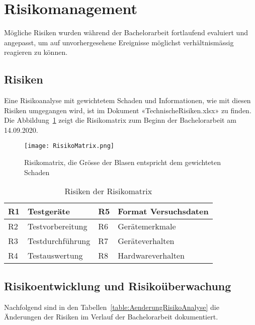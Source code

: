 \section{Risikomanagement
\label{Risikomanagement}}
Mögliche Risiken wurden während der Bachelorarbeit fortlaufend evaluiert 
und angepasst, um auf unvorhergesehene Ereignisse möglichst verhältnismässig 
reagieren zu können.

\subsection*{Risiken}
Eine Risikoanalyse mit gewichtetem Schaden und Informationen, 
wie mit diesen Risiken umgegangen wird, 
ist im Dokument «TechnischeRisiken.xlsx» zu finden. 
Die Abbildung~\ref{figure:Risikomatrix} zeigt die Risikomatrix zum Beginn
der Bachelorarbeit am 14.09.2020.

\begin{figure}[h!]
	\centering
	\texttt{[image: RisikoMatrix.png]}
	\caption{Risikomatrix, die Grösse der Blasen entspricht dem gewichteten Schaden
	\label{figure:Risikomatrix}}
\end{figure}

\begin{table}[H]
	\centering
	\begin{tabularx}{\linewidth}{| l | X | l | X |}
		\hline
		R1 & Testgeräte & R5 & Format Versuchsdaten \\
		\hline
		R2 & Testvorbereitung & R6 & Gerätemerkmale \\
		\hline
		R3 & Testdurchführung & R7 & Geräteverhalten \\
		\hline
		R4 & Testauswertung & R8 & Hardwareverhalten \\		
		\hline 
	\end{tabularx} 
	\caption{Risiken der Risikomatrix
	\label{table:RisikenMatrix}} 
\end{table}

\clearpage 

\subsection*{Risikoentwicklung und Risikoüberwachung}
Nachfolgend sind in den Tabellen~\ref{table:AenderungRisikoAnalyse}
die Änderungen der Risiken im Verlauf der Bachelorarbeit dokumentiert.


